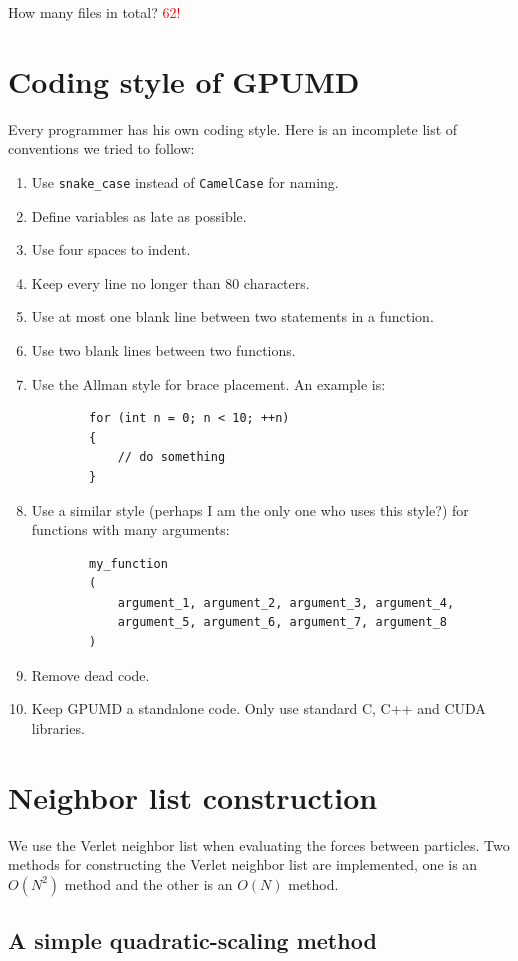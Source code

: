\documentclass[12pt,a4paper]{report}
\begin{document}
How many files in total? \textcolor{red}{62!}


\section{Coding style of GPUMD}

Every programmer has his own coding style. Here is an incomplete list of conventions we tried to follow:
\begin{enumerate}
\item Use \verb"snake_case" instead of \verb"CamelCase" for naming.
\item Define variables as late as possible.
\item Use four spaces to indent. 
\item Keep every line no longer than 80 characters.
\item Use at most one blank line between two statements in a function.
\item Use two blank lines between two functions.
\item Use the Allman style for brace placement. An example is:
    \begin{verbatim}
        for (int n = 0; n < 10; ++n) 
        {
            // do something
        }
    \end{verbatim}
\item Use a similar style (perhaps I am the only one who uses this style?) for functions with many arguments:
    \begin{verbatim}
        my_function
        (
            argument_1, argument_2, argument_3, argument_4, 
            argument_5, argument_6, argument_7, argument_8
        )
    \end{verbatim}
\item Remove dead code.
\item Keep GPUMD a standalone code. Only use standard C, C++ and CUDA libraries.
\end{enumerate}


\section{Neighbor list construction}


We use the Verlet neighbor list when evaluating the forces between particles. Two methods for constructing the Verlet neighbor list are implemented, one is an $O(N^2)$ method and the other is an $O(N)$ method.


\subsection{A simple quadratic-scaling method}
\end{document}
